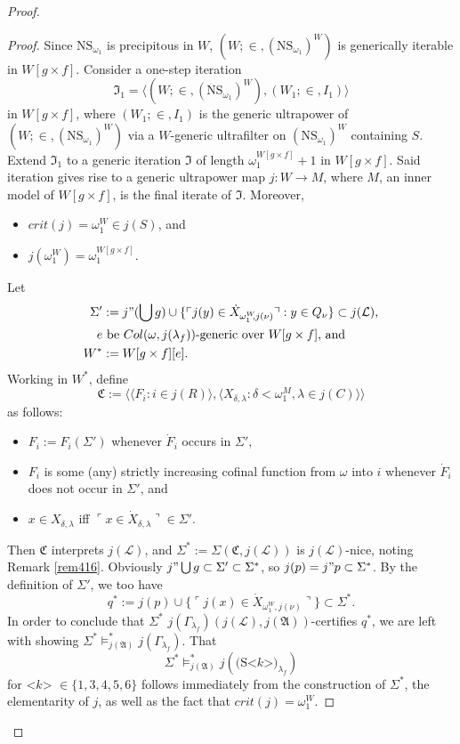 \documentclass[12pt]{article}
\numberwithin{equation}{section}
\begin{document}
\begin{proof}
\begin{proof}
Since $\mathrm{NS}_{\omega_1}$ is precipitous in $W$, $(W; \in, (\mathrm{NS}_{\omega_1})^W)$ is generically iterable in $W[g \times f]$. Consider a one-step iteration $$\mathfrak{I}_1 = \langle (W; \in, (\mathrm{NS}_{\omega_1})^W), (W_1; \in, I_1) \rangle$$ in $W[g \times f]$, where $(W_1; \in, I_1)$ is the generic ultrapower of $(W; \in, (\mathrm{NS}_{\omega_1})^W)$ via a $W$-generic ultrafilter on $(\mathrm{NS}_{\omega_1})^W$ containing $S$. Extend $\mathfrak{I}_1$ to a generic iteration $\mathfrak{I}$ of length $\omega_1^{W[g \times f]} + 1$ in $W[g \times f]$. Said iteration gives rise to a generic ultrapower map $j : W \longrightarrow M$, where $M$, an inner model of $W[g \times f]$, is the final iterate of $\mathfrak{I}$. Moreover, 
\begin{itemize}
    \item $crit(j) = \omega_1^W \in j(S)$, and
    \item $j(\omega_1^W) = \omega_1^{W[g \times f]}$.
\end{itemize}

Let 
\begin{align*}
    \Sigma' & := j" (\bigcup g) \cup \{\ulcorner j(y) \in \dot{X}_{\omega_1^W \!\! , j(\nu)} \urcorner : y \in Q_{\nu}\} \subset j(\mathcal{L}),  \\
    e  & \text{ be } Col(\omega, j(\lambda_f)) \text{-generic over }  W[g \times f] \text{, and} \\
    W^* & := W[g \times f][e].
\end{align*} 
Working in $W^*$, define $$\mathfrak{C} := \langle \langle F_i : i \in j(R) \rangle, \langle X_{\delta, \lambda} : \delta < \omega_1^M, \lambda \in j(C) \rangle \rangle$$ as follows:
\begin{itemize}
    \item $F_i := F_i(\Sigma')$ whenever $\dot{F}_i$ occurs in $\Sigma'$,
    \item $F_i$ is some (any) strictly increasing cofinal function from $\omega$ into $i$ whenever $\dot{F}_i$ does not occur in $\Sigma'$, and
    \item $x \in X_{\delta, \lambda}$ iff $\ulcorner x \in \dot{X}_{\delta, \lambda} \urcorner \in \Sigma'$.
\end{itemize}
Then $\mathfrak{C}$ interprets $j(\mathcal{L})$, and $\Sigma^* := \Sigma(\mathfrak{C}, j(\mathcal{L}))$ is $j(\mathcal{L})$-nice, noting Remark \ref{rem416}. Obviously $j" \bigcup g \subset \Sigma' \subset \Sigma^*$, so $j(p) = j" p \subset \Sigma^*$. By the definition of $\Sigma'$, we too have $$q^* := j(p) \cup \{\ulcorner j(x) \in \dot{X}_{\omega_1^W \!\! , j(\nu)} \urcorner\} \subset \Sigma^*.$$ In order to conclude that $\Sigma^*$ $j(\Gamma_{\lambda_f})(j(\mathcal{L}), j(\mathfrak{A}))$-certifies $q^*$, we are left with showing $\Sigma^* \models^*_{j(\mathfrak{A})} j(\Gamma_{\lambda_f})$. That $$\Sigma^* \models^*_{j(\mathfrak{A})} j(\text{(S<} k \text{>)}_{\lambda_f})$$ for <$k$> $\in \{1, 3, 4, 5, 6\}$ follows immediately from the construction of $\Sigma^*$, the elementarity of $j$, as well as the fact that $crit(j) = \omega_1^W$.


\end{proof}
\end{proof}
\end{document}

